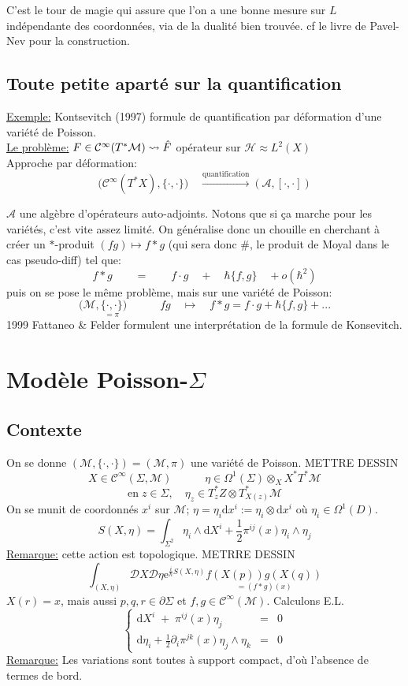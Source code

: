 \documentclass[a4paper,11pt]{article}
\renewcommand{\d}{{\mathrm{d}}}
\newcommand{\D}{{\mathcal{D}}}
\newcommand{\e}{{\mathrm{e}}}
\begin{document}
C'est le tour de magie qui assure que l'on a une bonne mesure sur $L$ indépendante des coordonnées, via de la dualité bien trouvée. cf le livre de Pavel-Nev pour la construction.

\subsection{Toute petite aparté sur la quantification}
\underline{Exemple:} Kontsevitch (1997) formule de quantification par déformation d'une variété de Poisson.\\

\noindent\underline{Le problème:}
$F \in \mathcal{C}^\infty(T^*\mathcal M) \rightsquigarrow \Hat F$ opérateur sur $\mathcal{H}\approx L^2(X)$\\
Approche par déformation: 
$$\Big( \mathcal{C}^\infty(T^*X), \{\cdot,\cdot\}\Big) \quad \overset{\mathrm{quantification}}\longrightarrow (\mathcal{A},[\cdot,\cdot])$$

$\mathcal{A}$ une algèbre d'opérateurs auto-adjoints. Notons que si ça marche pour les variétés, c'est vite assez limité. On généralise donc un chouille en cherchant à créer un $*$-produit $(fg)\mapsto f * g$ (qui sera donc \#, le produit de Moyal dans le cas pseudo-diff) tel que:
$$f*g \quad\quad = \quad\quad f \cdot g \quad+\quad \hbar \{f,g\} \quad+ o(\hbar^2)$$
puis on se pose le même problème, mais sur une variété de Poisson:
$$\Big(\mathcal M, \underset{=\pi}{\{\cdot,\cdot\}}\Big) \quad \quad \quad fg \quad \mapsto \quad f*g = f\cdot g + \hbar \{f,g\} + ...$$
1999 Fattaneo \& Felder formulent une interprétation de la formule de Konsevitch.

\section{Modèle Poisson-$\Sigma$}
\subsection{Contexte}
On se donne $(\mathcal{M},\{\cdot,\cdot\}) = (\mathcal{M},\pi)$ une variété de Poisson. \color{red} METTRE DESSIN\color{black}
$$X \in \mathcal{C}^\infty (\Sigma,\mathcal M)\quad\quad\quad \eta \in\Omega^1(\Sigma)\otimes_X X^*T^*\mathcal{M}$$
$$\mathrm{en}\; z \in \Sigma, \quad \eta_z \in T^*_z Z \otimes T^*_{X(z)}\mathcal{M}$$
On se munit de coordonnés $x^i$ sur $\mathcal{M}$; $\eta = \eta_i \d x^i:= \eta_i\otimes \d x^i$ où $\eta_i \in \Omega^1(D)$.
$$S(X,\eta) = \int_{\Sigma^2} \eta_i \wedge \d X^i + \frac12 \pi^{ij} (x) \eta_i\wedge \eta_j $$
\underline{Remarque:} cette action est topologique. \color{red} METRRE DESSIN\color{black} 
$$\int_{(X,\eta)} \D X \D \eta \e^{\frac i\hbar S(X,\eta)} \underset{=(f*g)(x)}{f(X(p))g(X(q))}$$
$X(r)=x$, mais aussi $p,q,r \in \partial \Sigma$ et $f,g\in\mathcal C^\infty (\mathcal{M})$. Calculons E.L.
$$\left\{\begin{matrix}
\d X^i \;+\; \pi^{ij} (x)\eta_j &=& 0\\
\d \eta_i + \frac12 \partial_i \pi^{jk}(x) \eta_j\wedge\eta_k \!\!\! &=& 0
\end{matrix}\right.$$
\underline{Remarque:} Les variations sont toutes à support compact, d'où l'absence de termes de bord.
\end{document}
